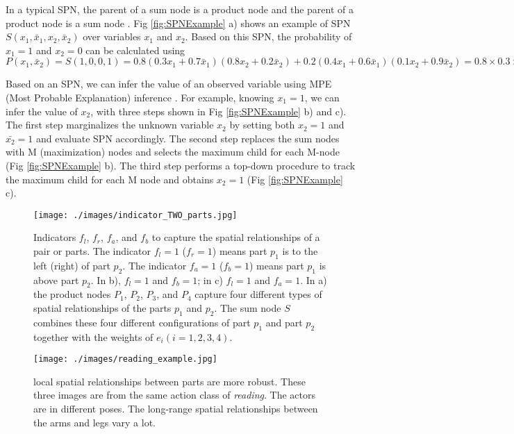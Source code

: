 \documentclass[journal]{IEEEtran}
\begin{document}
In a typical SPN, the parent of a sum node is a product node and the parent of a product node is a sum node \cite{SPNWangXiaogangFacial,poon2011SPNIntroduce}. Fig \ref{fig:SPNExample} a) shows an example of SPN $ S(x_1,\bar{x}_1,x_2,\bar{x}_2) $ over variables $ x_1 $ and $ x_2 $. Based on this SPN, the probability of $ x_1=1 $ and $ x_2=0 $ can be calculated using $ P(x_1,\bar{x}_2)=S(1,0,0,1)=0.8(0.3x_1+0.7\bar{x}_1)(0.8x_2+0.2\bar{x}_2)+0.2(0.4x_1+0.6\bar{x}_1)(0.1x_2+0.9\bar{x}_2)=0.8\times0.3\times0.2+0.2\times0.4\times0.9=0.12 $

Based on an SPN, we can infer the value of an observed variable using MPE (Most Probable Explanation) inference \cite{Darwiche:2003:DAI:765568.765570}. For example, knowing $ x_1=1 $, we can infer the value of $ x_2 $, with three steps shown in Fig \ref{fig:SPNExample} b) and c). The first step marginalizes the unknown variable $ x_2 $ by setting both $ x_2=1 $ and $ \bar{x_2}=1 $ and evaluate SPN accordingly. The second step replaces the sum nodes with M (maximization) nodes and selects the maximum child for each M-node (Fig \ref{fig:SPNExample} b). The third step performs a top-down procedure to track the maximum child for each M node and obtains $ x_2=1 $ (Fig \ref{fig:SPNExample} c).




\begin{figure}[h]
	\begin{center}
		\texttt{[image: ./images/indicator\_TWO\_parts.jpg]}
	\end{center}
	\caption{Indicators $ f_l $, $ f_r $, $ f_a $, and $ f_b $ to capture the spatial relationships of a pair or parts. The indicator $ f_l=1  $ ($ f_r=1 $) means part $ p_1 $ is to the left (right) of part $ p_2 $. The indicator $ f_a=1 $ ($ f_b=1 $) means part $ p_1 $ is above part $ p_2 $. In b), $ f_l=1 $ and $ f_b=1 $; in c) $ f_l=1 $ and $ f_a=1 $. In a) the product nodes $ P_1 $, $ P_2 $, $ P_3 $, and $ P_4 $ capture four different types of spatial relationships of the parts $ p_1 $ and $ p_2 $. The sum node $ S $ combines these four different configurations of part $ p_1 $ and part $ p_2 $ together with the weights of $ e_i (i=1,2,3,4)$. }
	\label{fig:IndicatorforTwoparts}
\end{figure}



\begin{figure}[htb]
	\begin{center}
		\texttt{[image: ./images/reading\_example.jpg]}
	\end{center}
	\caption{local spatial relationships between parts are more robust. These three images are from the same action class of \textit{reading}. The actors are in different poses. The long-range spatial relationships between the arms and legs vary a lot.}
	\label{fig:reading_example}
\end{figure}
\end{document}
